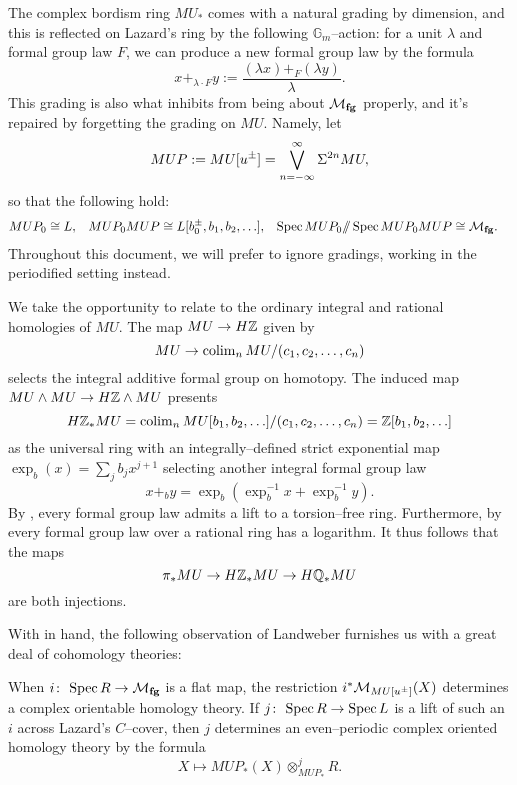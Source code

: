 \begin{remark}\label{WarningAboutGradings}
The complex bordism ring $MU_*$ comes with a natural grading by dimension, and this is reflected on Lazard's ring by the following $\mathbb G_m$--action: for a unit $\lambda$ and formal group law $F$, we can produce a new formal group law by the formula \[x +_{\lambda \cdot F} y := \frac{(\lambda x) +_F (\lambda y)}{\lambda}.\]  This grading is also what inhibits  from being about $\mathcal{M}_{\mathbf{fg}}$ properly, and it's repaired by forgetting the grading on $MU$.  Namely, let \[MUP := MU[u^\pm] = \bigvee_{n=-\infty}^\infty \Sigma^{2n} MU,\] so that the following hold:
\begin{align*}
MUP_0 & \cong L, & MUP_0 MUP & \cong L[b_0^\pm, b_1, b_2, \ldots], & \operatorname{Spec} MUP_0 /\!\!/ \operatorname{Spec} MUP_0 MUP & \cong \mathcal{M}_{\mathbf{fg}}.
\end{align*}
Throughout this document, we will prefer to ignore gradings, working in the periodified setting instead.
\end{remark}

\begin{remark}
We take the opportunity to relate  to the ordinary integral and rational homologies of $MU$.  The map $MU \to H\mathbb Z$ given by \[MU \to \operatorname{colim}_n MU / (c_1, c_2, \ldots, c_n)\] selects the integral additive formal group on homotopy.  The induced map $MU \wedge MU \to H\mathbb Z \wedge MU$ presents \[H\mathbb Z_* MU = \operatorname{colim}_n MU[b_1, b_2, \ldots] / (c_1, c_2, \ldots, c_n) = \mathbb Z[b_1, b_2, \ldots]\] as the universal ring with an integrally--defined strict exponential map $\exp_b(x) = \sum_j b_j x^{j+1}$ selecting another integral formal group law \[x +_b y = \exp_b( \exp^{-1}_b x + \exp^{-1}_b y).\]  By , every formal group law admits a lift to a torsion--free ring.  Furthermore, by  every formal group law over a rational ring has a logarithm.  It thus follows that the maps \[\pi_* MU \to H\mathbb Z_* MU \to H\mathbb{Q}_* MU\] are both injections.
\end{remark}

With  in hand, the following observation of Landweber furnishes us with a great deal of cohomology theories:
\begin{theorem}\label{LandweberExactness}
When $i \colon\thinspace \operatorname{Spec} R \to \mathcal{M}_{\mathbf{fg}}$ is a flat map, the restriction $i^* \mathcal{M}_{MU[u^\pm]}(X)$ determines a complex orientable homology theory.  If $j \colon\thinspace \operatorname{Spec} R \to \operatorname{Spec} L$ is a lift of such an $i$ across Lazard's $C$--cover, then $j$ determines an even--periodic complex oriented homology theory by the formula \[X \mapsto MUP_*(X) \otimes_{MUP_*}^j R.\]
\end{theorem}

